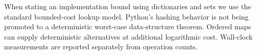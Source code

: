 \documentclass[11pt,a4paper]{article}
\theoremstyle{definition}
\theoremstyle{remark}
\begin{document}
When stating an implementation bound using dictionaries and sets we use the
standard bounded-cost lookup model.  Python's hashing behavior is not being
promoted to a deterministic worst-case data-structure theorem.  Ordered
maps can supply deterministic alternatives at additional logarithmic cost.
Wall-clock measurements are reported separately from operation counts.











\clearpage

\begingroup\raggedright

\endgroup
\end{document}
